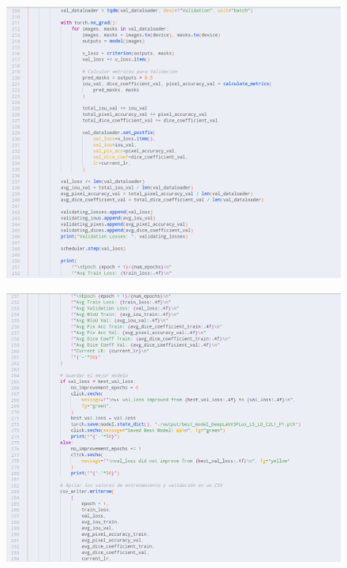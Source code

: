 \begin{figure}[h!]
	\centering
	\includegraphics[width=0.9\linewidth]{graficos/entrenamiento6}
\end{figure}

\begin{figure}[h!]
	\centering
	\includegraphics[width=0.9\linewidth]{graficos/entrenamiento7}
\end{figure}

